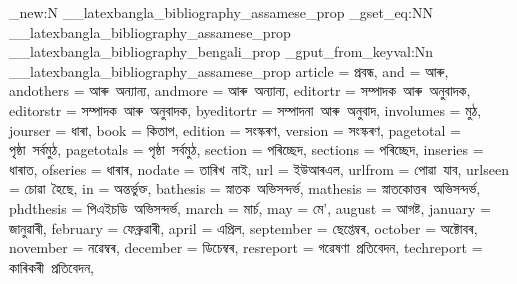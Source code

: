 \prop_new:N \g__latexbangla_bibliography_assamese_prop
\prop_gset_eq:NN \g__latexbangla_bibliography_assamese_prop
  \g__latexbangla_bibliography_bengali_prop
\prop_gput_from_keyval:Nn \g__latexbangla_bibliography_assamese_prop
  {
    article = {প্ৰবন্ধ},
    and = {আৰু},
    andothers = {আৰু~অন্যান্য},
    andmore = {আৰু~অন্যান্য},
    editortr = {সম্পাদক~আৰু~অনুবাদক},
    editorstr = {সম্পাদক~আৰু~অনুবাদক},
    byeditortr = {সম্পাদনা~আৰু~অনুবাদ},
    involumes = {মুঠ},
    jourser = {ধাৰা},
    book = {কিতাপ},
    edition = {সংস্কৰণ},
    version = {সংস্কৰণ},
    pagetotal = {পৃষ্ঠা~সৰ্বমুঠ},
    pagetotals = {পৃষ্ঠা~সৰ্বমুঠ},
    section = {পৰিচ্ছেদ},
    sections = {পৰিচ্ছেদ},
    inseries = {ধাৰাত},
    ofseries = {ধাৰাৰ},
    nodate = {তাৰিখ~নাই},
    url = {ইউআৰএল},
    urlfrom = {পোৱা~যাব},
    urlseen = {চোৱা~হৈছে},
    in = {অন্তৰ্ভুক্ত},
    bathesis = {স্নাতক~অভিসন্দৰ্ভ},
    mathesis = {স্নাতকোত্তৰ~অভিসন্দৰ্ভ},
    phdthesis = {পিএইচডি~অভিসন্দৰ্ভ},
    march = {মাৰ্চ},
    may = {মে’},
    august = {আগষ্ট},
    january = {জানুৱাৰী},
    february = {ফেব্ৰুৱাৰী},
    april = {এপ্ৰিল},
    september = {ছেপ্তেম্বৰ},
    october = {অক্টোবৰ},
    november = {নৱেম্বৰ},
    december = {ডিচেম্বৰ},
    resreport = {গৱেষণা~প্ৰতিবেদন},
    techreport = {কাৰিকৰী~প্ৰতিবেদন},
  }
\endinput
